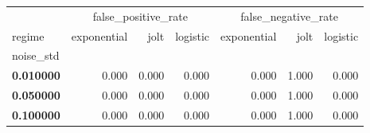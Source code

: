 \begin{tabular}{lrrrrrr}
\toprule
 & \multicolumn{3}{c}{false_positive_rate} & \multicolumn{3}{c}{false_negative_rate} \\
regime & exponential & jolt & logistic & exponential & jolt & logistic \\
noise_std &  &  &  &  &  &  \\
\midrule
\textbf{0.010000} & 0.000 & 0.000 & 0.000 & 0.000 & 1.000 & 0.000 \\
\textbf{0.050000} & 0.000 & 0.000 & 0.000 & 0.000 & 1.000 & 0.000 \\
\textbf{0.100000} & 0.000 & 0.000 & 0.000 & 0.000 & 1.000 & 0.000 \\
\bottomrule
\end{tabular}
